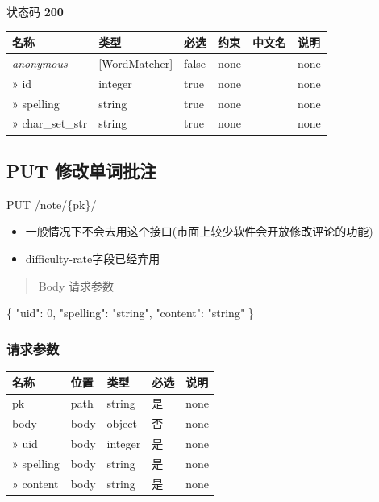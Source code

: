 \documentclass[
]{article}
\newenvironment{Shaded}{}{}
\newcommand{\DataTypeTok}[1]{\textcolor[rgb]{0.56,0.13,0.00}{#1}}
\newcommand{\DecValTok}[1]{\textcolor[rgb]{0.25,0.63,0.44}{#1}}
\newcommand{\FunctionTok}[1]{\textcolor[rgb]{0.02,0.16,0.49}{#1}}
\newcommand{\StringTok}[1]{\textcolor[rgb]{0.25,0.44,0.63}{#1}}
\begin{document}
状态码 \textbf{200}

\begin{longtable}[]{@{}llllll@{}}
\toprule
名称 & 类型 & 必选 & 约束 & 中文名 & 说明 \\
\midrule
\endhead
\emph{anonymous} &
{[}\protect\hyperlink{schemawordmatcher}{WordMatcher}{]} & false & none
& & none \\
» id & integer & true & none & & none \\
» spelling & string & true & none & & none \\
» char\_set\_str & string & true & none & & none \\
\bottomrule
\end{longtable}

\hypertarget{put-ux4feeux6539ux5355ux8bcdux6279ux6ce8}{%
\subsection{PUT
修改单词批注}\label{put-ux4feeux6539ux5355ux8bcdux6279ux6ce8}}

PUT /note/\{pk\}/

\begin{itemize}
\item
  一般情况下不会去用这个接口(市面上较少软件会开放修改评论的功能)
\item
  difficulty-rate字段已经弃用
\end{itemize}

\begin{quote}
Body 请求参数
\end{quote}

\begin{Shaded}
\begin{Highlighting}[]
\FunctionTok{\{}
  \DataTypeTok{"uid"}\FunctionTok{:} \DecValTok{0}\FunctionTok{,}
  \DataTypeTok{"spelling"}\FunctionTok{:} \StringTok{"string"}\FunctionTok{,}
  \DataTypeTok{"content"}\FunctionTok{:} \StringTok{"string"}
\FunctionTok{\}}
\end{Highlighting}
\end{Shaded}

\hypertarget{ux8bf7ux6c42ux53c2ux6570-6}{%
\subsubsection{请求参数}\label{ux8bf7ux6c42ux53c2ux6570-6}}

\begin{longtable}[]{@{}lllll@{}}
\toprule
名称 & 位置 & 类型 & 必选 & 说明 \\
\midrule
\endhead
pk & path & string & 是 & none \\
body & body & object & 否 & none \\
» uid & body & integer & 是 & none \\
» spelling & body & string & 是 & none \\
» content & body & string & 是 & none \\
\bottomrule
\end{longtable}
\end{document}
